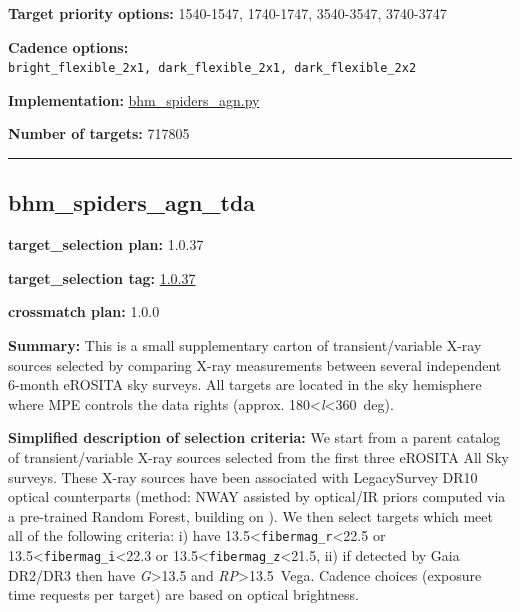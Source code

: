 \noindent\textbf{Target priority options:} 1540-1547, 1740-1747, 3540-3547,
3740-3747

\noindent\textbf{Cadence options:}
\texttt{bright\_flexible\_2x1,\ dark\_flexible\_2x1,\ dark\_flexible\_2x2}

\noindent\textbf{Implementation:}
\href{https://github.com/sdss/target_selection/blob/1.0.37/python/target_selection/cartons/bhm_spiders_agn.py}{bhm\_spiders\_agn.py}

\noindent\textbf{Number of targets:} 717805

\begin{center}\rule{0.5\linewidth}{0.5pt}\end{center}

\hypertarget{bhm_spiders_agn_tda_plan1.0.37}{%
\subsection{bhm\_spiders\_agn\_tda}\label{bhm_spiders_agn_tda_plan1.0.37}}

\noindent\textbf{target\_selection plan:} 1.0.37

\noindent\textbf{target\_selection tag:}
\href{https://github.com/sdss/target_selection/tree/1.0.37/}{1.0.37}

\noindent\textbf{crossmatch plan:} 1.0.0

\noindent\textbf{Summary:} This is a small supplementary carton of
transient/variable X-ray sources selected by comparing X-ray
measurements between several independent 6-month eROSITA sky surveys.
All targets are located in the sky hemisphere where MPE controls the
data rights (approx. 180\textless{}\emph{l}\textless360~deg).

\noindent\textbf{Simplified description of selection criteria:} We start from a
parent catalog of transient/variable X-ray sources selected from the
first three eROSITA All Sky surveys. These X-ray sources have been
associated with LegacySurvey DR10 optical counterparts (method: NWAY
assisted by optical/IR priors computed via a pre-trained Random Forest,
building on
\citealt{Salvato2022}). We then select targets which meet all of the following
criteria: i) have 13.5\textless{}\texttt{fibermag\_r}\textless22.5 or
13.5\textless{}\texttt{fibermag\_i}\textless22.3 or
13.5\textless{}\texttt{fibermag\_z}\textless21.5, ii) if detected by
Gaia DR2/DR3 then have \emph{G}\textgreater13.5 and
\emph{RP}\textgreater13.5~Vega. Cadence choices (exposure time requests
per target) are based on optical brightness.


